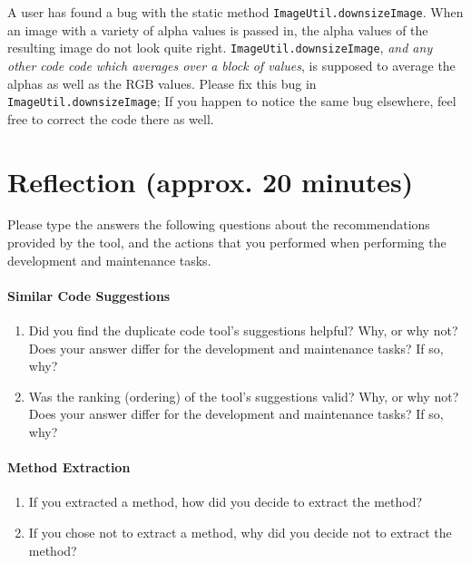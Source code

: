 \documentclass[12pt]{article}
\begin{document}
A user has found a bug with the static method
\verb|ImageUtil.downsizeImage|.  When an image with a variety of alpha
values is passed in, the alpha values of the resulting image do not
look quite right.  \verb|ImageUtil.downsizeImage|, \textit{and any
  other code code which averages over a block of values}, is supposed
to average the alphas as well as the RGB values.  Please fix this bug
in \verb|ImageUtil.downsizeImage|; If you happen to notice the same
bug elsewhere, feel free to correct the code there as well.

\section{Reflection (approx. 20 minutes)}

Please type the answers the following questions about the
recommendations provided by the tool, and the actions that you
performed when performing the development and maintenance tasks.

\paragraph{Similar Code Suggestions}

\begin{enumerate}
  \item Did you find the duplicate code tool's suggestions helpful?
    Why, or why not? Does your answer differ for the development and
    maintenance tasks? If so, why?
  \item Was the ranking (ordering) of the tool's suggestions valid?
    Why, or why not? Does your answer differ for the development and
    maintenance tasks? If so, why?
\end{enumerate}

\paragraph{Method Extraction}

\begin{enumerate}
  \item If you extracted a method, how did you decide to extract the
    method? 
  \item If you chose not to extract a method, why did you decide not
    to extract the method?
\end{enumerate}
\end{document}
